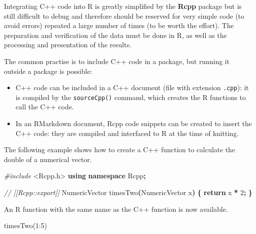\documentclass[
  12pt,
  american,
  a4paper,
  extrafontsizes,onecolumn,openright
  ]{memoir}
\newenvironment{Shaded}{\begin{snugshade}}{\end{snugshade}}
\newcommand{\CommentTok}[1]{\textcolor[rgb]{0.56,0.35,0.01}{\textit{#1}}}
\newcommand{\ControlFlowTok}[1]{\textcolor[rgb]{0.13,0.29,0.53}{\textbf{#1}}}
\newcommand{\DecValTok}[1]{\textcolor[rgb]{0.00,0.00,0.81}{#1}}
\newcommand{\FunctionTok}[1]{\textcolor[rgb]{0.00,0.00,0.00}{#1}}
\newcommand{\ImportTok}[1]{#1}
\newcommand{\KeywordTok}[1]{\textcolor[rgb]{0.13,0.29,0.53}{\textbf{#1}}}
\newcommand{\NormalTok}[1]{#1}
\newcommand{\OperatorTok}[1]{\textcolor[rgb]{0.81,0.36,0.00}{\textbf{#1}}}
\newcommand{\PreprocessorTok}[1]{\textcolor[rgb]{0.56,0.35,0.01}{\textit{#1}}}
\newcommand{\SpecialCharTok}[1]{\textcolor[rgb]{0.00,0.00,0.00}{#1}}
\providecommand{\tightlist}{%
  \setlength{\itemsep}{0pt}\setlength{\parskip}{0pt}}
\newlength{\rf}
\begin{document}
Integrating C++ code into R is greatly simplified by the \textbf{Rcpp} package but is still difficult to debug and therefore should be reserved for very simple code (to avoid errors) repeated a large number of times (to be worth the effort).
The preparation and verification of the data must be done in R, as well as the processing and presentation of the results.

The common practise is to include C++ code in a package, but running it outside a package is possible:

\begin{itemize}
\tightlist
\item
  C++ code can be included in a C++ document (file with extension \texttt{.cpp}): it is compiled by the \texttt{sourceCpp()} command, which creates the R functions to call the C++ code.
\item
  In an RMarkdown document, Rcpp code snippets can be created to insert the C++ code: they are compiled and interfaced to R at the time of knitting.
\end{itemize}

The following example shows how to create a C++ function to calculate the double of a numerical vector.

\scriptsize

\begin{Shaded}
\begin{Highlighting}[]
\PreprocessorTok{\#include }\ImportTok{\textless{}Rcpp.h\textgreater{}}
\KeywordTok{using} \KeywordTok{namespace}\NormalTok{ Rcpp}\OperatorTok{;}

\CommentTok{// [[Rcpp::export]]}
\NormalTok{NumericVector timesTwo}\OperatorTok{(}\NormalTok{NumericVector x}\OperatorTok{)} \OperatorTok{\{}
  \ControlFlowTok{return}\NormalTok{ x }\OperatorTok{*} \DecValTok{2}\OperatorTok{;}
\OperatorTok{\}}
\end{Highlighting}
\end{Shaded}

\normalsize

An R function with the same name as the C++ function is now available.

\scriptsize

\begin{Shaded}
\begin{Highlighting}[]
\FunctionTok{timesTwo}\NormalTok{(}\DecValTok{1}\SpecialCharTok{:}\DecValTok{5}\NormalTok{)}
\end{Highlighting}
\end{Shaded}
\end{document}

